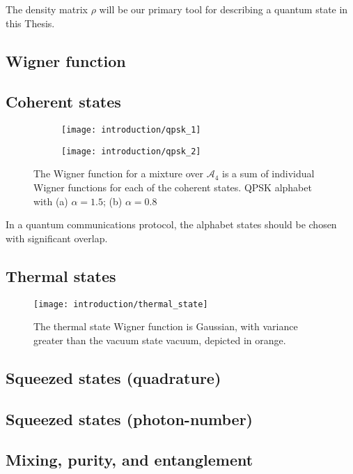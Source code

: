The density matrix $\rho$ will be our primary tool for describing a quantum state in this Thesis.

\subsection{Wigner function}

\subsection{Coherent states}
\begin{figure}[htp]
\centering
\begin{subfigure}[b]{0.4\linewidth}
\texttt{[image: introduction/qpsk\_1]}
\caption{}
\end{subfigure}
\begin{subfigure}[b]{0.4\linewidth}
\texttt{[image: introduction/qpsk\_2]}
\caption{}
\end{subfigure}
\caption{\label{fig:qpsk} The Wigner function for a mixture over $\mathcal{A}_4$ is a sum of individual Wigner functions for each of the coherent states. QPSK alphabet with (a) $\alpha=1.5$; (b) $\alpha=0.8$}
\end{figure}
 In a quantum communications protocol, the alphabet states should be chosen with significant overlap.


\subsection{Thermal states}
\begin{figure}[htp]
\centering
\texttt{[image: introduction/thermal\_state]}
\caption{\label{fig:thermal_state} The thermal state Wigner function is Gaussian, with variance greater than the vacuum state vacuum, depicted in orange.}
\end{figure}
\subsection{Squeezed states (quadrature)}

\subsection{Squeezed states (photon-number)}

\subsection{Mixing, purity, and entanglement}

